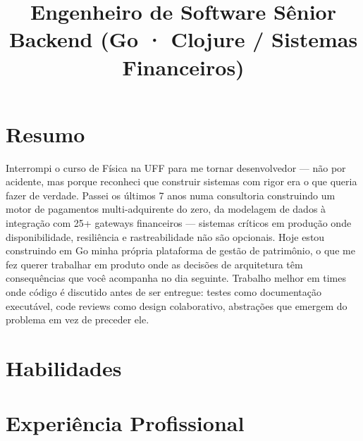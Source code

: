 \documentclass[10pt,a4paper,sans]{moderncv}
\title{Engenheiro de Software Sênior Backend (Go · Clojure / Sistemas Financeiros)}
\begin{document}
\makecvtitle

\section{Resumo}
Interrompi o curso de Física na UFF para me tornar desenvolvedor --- não por acidente, mas porque reconheci que construir sistemas com rigor era o que queria fazer de verdade. Passei os últimos 7 anos numa consultoria construindo um motor de pagamentos multi-adquirente do zero, da modelagem de dados à integração com 25+ gateways financeiros --- sistemas críticos em produção onde disponibilidade, resiliência e rastreabilidade não são opcionais. Hoje estou construindo em Go minha própria plataforma de gestão de patrimônio, o que me fez querer trabalhar em produto onde as decisões de arquitetura têm consequências que você acompanha no dia seguinte. Trabalho melhor em times onde código é discutido antes de ser entregue: testes como documentação executável, code reviews como design colaborativo, abstrações que emergem do problema em vez de preceder ele.

\section{Habilidades}

\section{Experiência Profissional}
\end{document}
